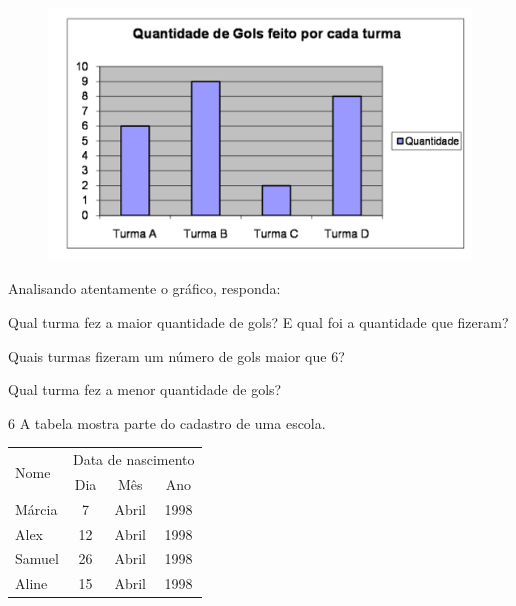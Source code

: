 \begin{figure}[htpb!]
\includegraphics[width=\textwidth]{./imgs/mat13.png}
\end{figure}

Analisando atentamente o gráfico, responda:

\begin{escolha}
\item
  Qual turma fez a maior quantidade de gols? E qual foi a quantidade que fizeram?


\item
  Quais turmas fizeram um número de gols maior que 6?


\item
  Qual turma fez a menor quantidade de gols?

\end{escolha}

\pagebreak
\num{6} A tabela mostra parte do cadastro de uma escola.

\begin{center}
\begin{tabular}{l|ccc}
\hline
\multirow{2}{*}{Nome} & \multicolumn{3}{l}{Data de nascimento} \\ \cline{2-4} 
 & \multicolumn{1}{c|}{Dia} & \multicolumn{1}{c|}{Mês} & Ano \\ \hline
Márcia & \multicolumn{1}{c|}{7} & \multicolumn{1}{c|}{Abril} & 1998 \\ \hline
Alex & \multicolumn{1}{c|}{12} & \multicolumn{1}{c|}{Abril} & 1998 \\ \hline
Samuel & \multicolumn{1}{c|}{26} & \multicolumn{1}{c|}{Abril} & 1998 \\ \hline
Aline & \multicolumn{1}{c|}{15} & \multicolumn{1}{c|}{Abril} & 1998 \\ \hline
\end{tabular}
\end{center}

